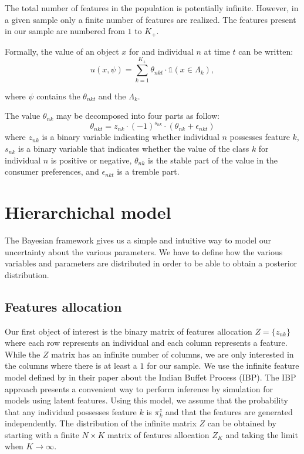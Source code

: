 \documentclass[12pt]{article}
\begin{document}
The total number of features in the population is potentially infinite. However, in a given sample only a finite number of features are realized. The features present in our sample are numbered from $1$ to $K_+$.

Formally, the value of an object $x$ for and individual $n$ at time $t$ can be written:
\begin{equation}\label{e:uff}
	u(x,\psi) = \sum_{k=1}^{K_+} \theta_{nkt} \cdot \mathds{1}(x \in \Lambda_k),
\end{equation}

where $\psi$ contains the $\theta_{nkt}$ and the $\Lambda_k$.

The value $\theta_{nk}$ may be decomposed into four parts as follow:
$$ \theta_{nkt} = z_{nk} \cdot (-1)^{s_{nk}} \cdot (\theta_{nk} + \epsilon_{nkt}) $$
where $z_{nk}$ is a binary variable indicating whether individual $n$ possesses feature $k$, $s_{nk}$ is a binary variable that indicates whether the value of the class $k$ for individual $n$ is positive or negative, $\theta_{nk}$ is the stable part of the value in the consumer preferences, and $\epsilon_{nkt}$ is a tremble part. 

\section{Hierarchichal model}

The Bayesian framework gives us a simple and intuitive way to model our uncertainty about the various parameters. We have to define how the various variables and parameters are distributed in order to be able to obtain a posterior distribution.

\subsection{Features allocation}

Our first object of interest is the binary matrix of features allocation $Z=\{z_{nk}\}$ where each row represents an individual and each column represents a feature. While the $Z$ matrix has an infinite number of columns, we are only interested in the columns where there is at least a $1$ for our sample. We use the infinite feature model defined by \cite{griffiths2011indian} in their paper about the Indian Buffet Process (IBP). The IBP approach presents a convenient way to perform inference by simulation for models using latent features. Using this model, we assume that the probability that any individual possesses feature $k$ is $\pi_k^z$ and that the features are generated independently. The distribution of the infinite matrix $Z$ can be obtained by starting with a finite $N \times K$ matrix of features allocation $Z_K$ and taking the limit when $K \to \infty$.
\end{document}

